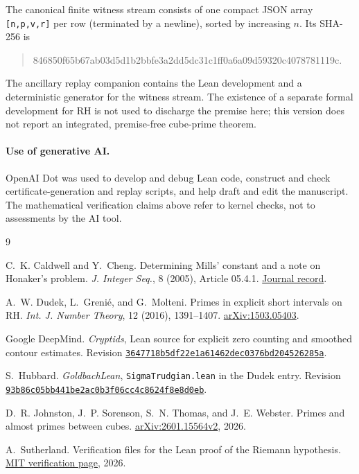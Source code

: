 \documentclass[10pt]{article}
\begin{document}
The canonical finite witness stream consists of one compact JSON array
\texttt{[n,p,v,r]} per row (terminated by a newline), sorted by increasing \(n\). Its
SHA-256 is
\begin{quote}
\small\ttfamily 846850f65b67ab03d5d1b2bbfe3a2dd5dc31c1ff0a6a09d59320c4078781119c.
\end{quote}
The ancillary replay companion contains the Lean development and a
deterministic generator for the witness stream. The existence of a separate formal development for RH \cite{rhcheck}
is not used to discharge the premise here; this version does not report an
integrated, premise-free cube-prime theorem.

\paragraph{Use of generative AI.}
OpenAI Dot was used to develop and debug Lean code, construct and check
certificate-generation and replay scripts, and help draft and edit the
manuscript. The mathematical verification claims above refer to kernel checks,
not to assessments by the AI tool.

\begin{thebibliography}{9}

C.~K. Caldwell and Y.~Cheng.
\newblock Determining Mills' constant and a note on Honaker's problem.
\newblock \emph{J. Integer Seq.}, 8 (2005), Article 05.4.1.
\newblock \href{https://cs.uwaterloo.ca/journals/JIS/VOL8/Caldwell/caldwell78.html}{Journal record}.

A.~W. Dudek, L.~Greni\'e, and G.~Molteni.
\newblock Primes in explicit short intervals on RH.
\newblock \emph{Int. J. Number Theory}, 12 (2016), 1391--1407.
\newblock \href{https://arxiv.org/abs/1503.05403}{arXiv:1503.05403}.

Google DeepMind.
\newblock \emph{Cryptids}, Lean source for explicit zero counting and smoothed
  contour estimates.
\newblock Revision
\href{https://github.com/google-deepmind/cryptids/tree/3647718b5df22e1a61462dec0376bd204526285a}{\texttt{3647718b5df22e1a61462dec0376bd204526285a}}.

S.~Hubbard.
\newblock \emph{GoldbachLean}, \texttt{SigmaTrudgian.lean} in the Dudek entry.
\newblock Revision
\href{https://github.com/sthubbar/goldbach-lean/tree/93b86c05bb441be2ac0b3f06cc4c8624f8e8d0eb/entries/dudek2014}{\texttt{93b86c05bb441be2ac0b3f06cc4c8624f8e8d0eb}}.

D.~R. Johnston, J.~P. Sorenson, S.~N. Thomas, and J.~E. Webster.
\newblock Primes and almost primes between cubes.
\newblock \href{https://arxiv.org/abs/2601.15564v2}{arXiv:2601.15564v2}, 2026.

A.~Sutherland.
\newblock Verification files for the Lean proof of the Riemann hypothesis.
\newblock \href{https://math.mit.edu/~drew/grh/}{MIT verification page}, 2026.

\end{thebibliography}
\end{document}
